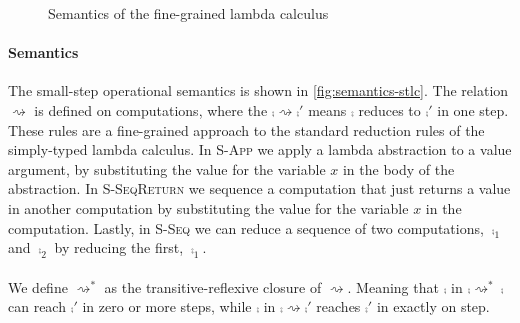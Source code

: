 {%

\begin{figure}
\caption{Semantics of the fine-grained lambda calculus}
\centering
{}
\end{figure}

\paragraph{Semantics}
The small-step operational semantics is shown in \cref{fig:semantics-stlc}.
The relation $\rightsquigarrow$ is defined on computations, where the $\comp \rightsquigarrow \comp'$ means $\comp$ reduces to $\comp'$ in one step.
These rules are a fine-grained approach to the standard reduction rules of the simply-typed lambda calculus.
In {\footnotesize\textsc{S-App}} we apply a lambda abstraction to a value argument, by substituting the value for the variable $x$ in the body of the abstraction.
In {\footnotesize\textsc{S-SeqReturn}} we sequence a computation that just returns a value in another computation by substituting the value for the variable $x$ in the computation.
Lastly, in {\footnotesize\textsc{S-Seq}} we can reduce a sequence of two computations, $\comp_1$ and $\comp_2$ by reducing the first, $\comp_1$.
\\\\
We define $\rightsquigarrow^*$ as the transitive-reflexive closure of $\rightsquigarrow$.
Meaning that $\comp$ in $\comp \rightsquigarrow^* \comp$ can reach $\comp'$ in zero or more steps, while $\comp$ in $\comp \rightsquigarrow \comp'$ reaches $\comp'$ in exactly on step.


}
